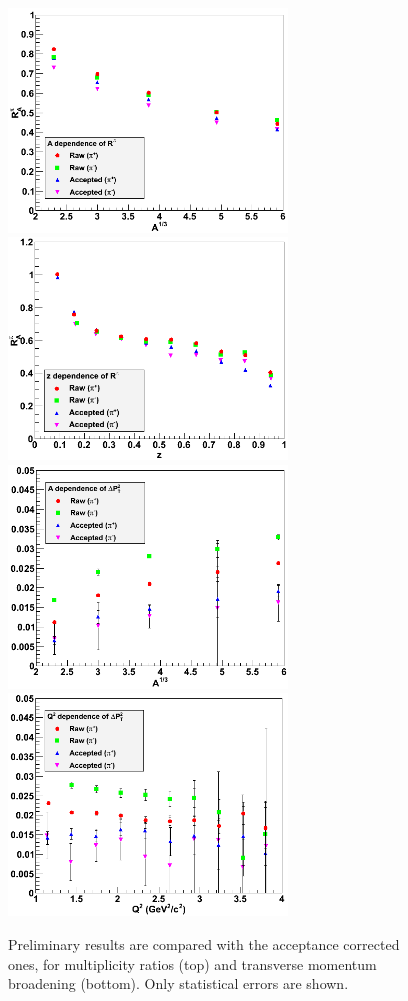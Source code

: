 \begin{figure}[tbp]
\centering
\includegraphics[width=7.4cm] {chap5-fig/b_RvA.png} 
\includegraphics[width=7.4cm] {chap5-fig/b_RvZ.png} 
\includegraphics[width=7.4cm] {chap5-fig/b_PvA.png} 
\includegraphics[width=7.4cm] {chap5-fig/b_PvQ2.png} 
\caption {Preliminary results are compared with the acceptance corrected ones, 
for multiplicity ratios (top) and transverse momentum broadening 
(bottom). Only statistical errors are shown.}
\label{fig:CCPlots}
\end{figure}


